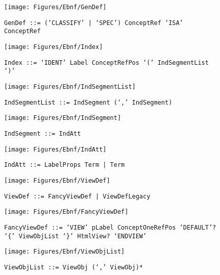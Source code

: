  \begin{figure}[H]
  \centering
  \texttt{[image: Figures/Ebnf/GenDef]}
  \caption*{\texttt{GenDef \small::=  (`CLASSIFY' | `SPEC') ConceptRef `ISA' ConceptRef}}
  \label{fig:ebnf-GenDef}
 \end{figure}

 \begin{figure}[H]
  \centering
  \texttt{[image: Figures/Ebnf/Index]}
  \caption*{\texttt{Index \small::=  `IDENT' Label ConceptRefPos `(' IndSegmentList `)'}}
  \label{fig:ebnf-Index}
 \end{figure}

 \begin{figure}[H]
  \centering
  \texttt{[image: Figures/Ebnf/IndSegmentList]}
  \caption*{\texttt{IndSegmentList \small::=  IndSegment (`,' IndSegment)}}
  \label{fig:ebnf-IndSegmentList}
 \end{figure}

 \begin{figure}[H]
  \centering
  \texttt{[image: Figures/Ebnf/IndSegment]}
  \caption*{\texttt{IndSegment \small::=  IndAtt}}
  \label{fig:ebnf-IndSegment}
 \end{figure}

 \begin{figure}[H]
  \centering
  \texttt{[image: Figures/Ebnf/IndAtt]}
  \caption*{\texttt{IndAtt \small::=  LabelProps Term | Term}}
  \label{fig:ebnf-IndAtt}
 \end{figure}

 \begin{figure}[H]
  \centering
  \texttt{[image: Figures/Ebnf/ViewDef]}
  \caption*{\texttt{ViewDef \small::=  FancyViewDef | ViewDefLegacy}}
  \label{fig:ebnf-ViewDef}
 \end{figure}

 \begin{figure}[H]
  \centering
  \texttt{[image: Figures/Ebnf/FancyViewDef]}
  \caption*{\texttt{FancyViewDef \small::=  `VIEW' pLabel ConceptOneRefPos `DEFAULT'? `\{' ViewObjList `\}' HtmlView? `ENDVIEW'}}
  \label{fig:ebnf-FancyViewDef}
 \end{figure}

 \begin{figure}[H]
  \centering
  \texttt{[image: Figures/Ebnf/ViewObjList]}
  \caption*{\texttt{ViewObjList \small::=  ViewObj (`,' ViewObj)*}}
  \label{fig:ebnf-ViewObjList}
 \end{figure}

